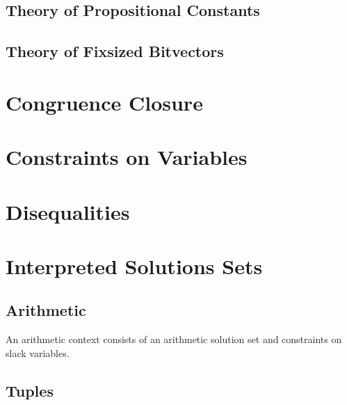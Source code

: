 \documentclass[12pt]{article}
\begin{document}
   

   


 \subsection{Theory of Propositional Constants}\label{subsec:propositional}

 

 


 \subsection{Theory of Fixsized Bitvectors}\label{subsec:bv}
  
  


\section{Congruence Closure}\label{sec:cc}

 
  

\section{Constraints on Variables}
  
  

\section{Disequalities}
  
  



\section{Interpreted Solutions Sets}\label{sec:cc}

 
 
 
 \subsection{Arithmetic}
  An arithmetic context consists of an arithmetic
  solution set and constraints on slack variables.
  
  

 \subsection{Tuples}
  
  
\end{document}
